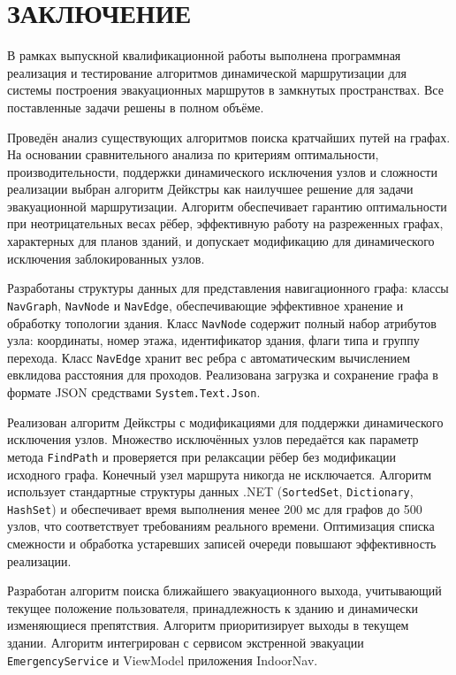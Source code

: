 \section*{ЗАКЛЮЧЕНИЕ}

В рамках выпускной квалификационной работы выполнена программная реализация и тестирование алгоритмов динамической маршрутизации для системы построения эвакуационных маршрутов в замкнутых пространствах. Все поставленные задачи решены в полном объёме.

Проведён анализ существующих алгоритмов поиска кратчайших путей на графах. На основании сравнительного анализа по критериям оптимальности, производительности, поддержки динамического исключения узлов и сложности реализации выбран алгоритм Дейкстры как наилучшее решение для задачи эвакуационной маршрутизации. Алгоритм обеспечивает гарантию оптимальности при неотрицательных весах рёбер, эффективную работу на разреженных графах, характерных для планов зданий, и допускает модификацию для динамического исключения заблокированных узлов.

Разработаны структуры данных для представления навигационного графа: классы \texttt{NavGraph}, \texttt{NavNode} и \texttt{NavEdge}, обеспечивающие эффективное хранение и обработку топологии здания. Класс \texttt{NavNode} содержит полный набор атрибутов узла: координаты, номер этажа, идентификатор здания, флаги типа и группу перехода. Класс \texttt{NavEdge} хранит вес ребра с автоматическим вычислением евклидова расстояния для проходов. Реализована загрузка и сохранение графа в формате JSON средствами \texttt{System.Text.Json}.

Реализован алгоритм Дейкстры с модификациями для поддержки динамического исключения узлов. Множество исключённых узлов передаётся как параметр метода \texttt{FindPath} и проверяется при релаксации рёбер без модификации исходного графа. Конечный узел маршрута никогда не исключается. Алгоритм использует стандартные структуры данных .NET (\texttt{SortedSet}, \texttt{Dictionary}, \texttt{HashSet}) и обеспечивает время выполнения менее 200 мс для графов до 500 узлов, что соответствует требованиям реального времени. Оптимизация списка смежности и обработка устаревших записей очереди повышают эффективность реализации.

Разработан алгоритм поиска ближайшего эвакуационного выхода, учитывающий текущее положение пользователя, принадлежность к зданию и динамически изменяющиеся препятствия. Алгоритм приоритизирует выходы в текущем здании. Алгоритм интегрирован с сервисом экстренной эвакуации \texttt{EmergencyService} и ViewModel приложения IndoorNav.

